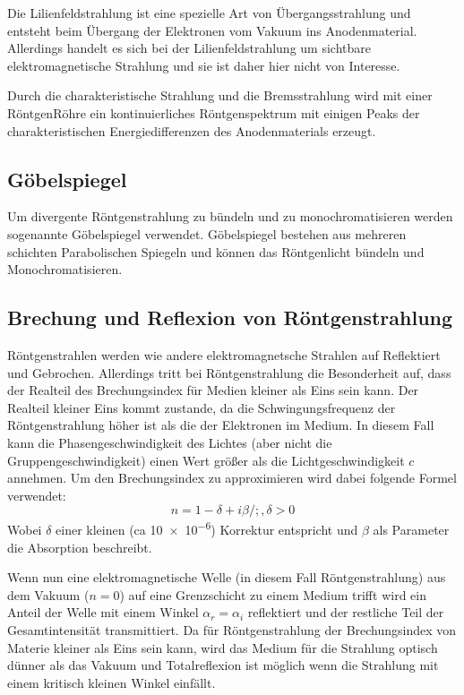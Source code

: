         Die Lilienfeldstrahlung ist eine spezielle Art von Übergangsstrahlung und entsteht beim Übergang der Elektronen vom Vakuum ins Anodenmaterial. Allerdings handelt es sich bei der Lilienfeldstrahlung um sichtbare elektromagnetische Strahlung und sie ist daher hier nicht von Interesse.

        Durch die charakteristische Strahlung und die Bremsstrahlung wird mit einer RöntgenRöhre ein kontinuierliches Röntgenspektrum mit einigen Peaks der charakteristischen Energiedifferenzen des Anodenmaterials erzeugt.
    \subsection{Göbelspiegel}
        Um divergente Röntgenstrahlung zu bündeln und zu monochromatisieren werden sogenannte Göbelspiegel verwendet.
        Göbelspiegel bestehen aus mehreren schichten Parabolischen Spiegeln und können das Röntgenlicht bündeln und Monochromatisieren.
    \subsection{Brechung und Reflexion von Röntgenstrahlung}
        Röntgenstrahlen werden wie andere elektromagnetsche Strahlen auf Reflektiert und Gebrochen.
        Allerdings tritt bei Röntgenstrahlung die Besonderheit auf, dass der Realteil des Brechungsindex für Medien kleiner als Eins sein kann.
        Der Realteil kleiner Eins kommt zustande, da die Schwingungsfrequenz der Röntgenstrahlung höher ist als die der Elektronen im Medium.
        In diesem Fall kann die Phasengeschwindigkeit des Lichtes (aber nicht die Gruppengeschwindigkeit) einen Wert größer als die Lichtgeschwindigkeit $c$ annehmen.
        Um den Brechungsindex zu approximieren wird dabei folgende Formel verwendet:
        \begin{equation}
            n = 1-\delta+i\beta /; , \delta > 0
        \end{equation}
        Wobei $\delta$ einer kleinen (ca \num{10e-6}) Korrektur entspricht und $\beta$ als Parameter die Absorption beschreibt.
        
        Wenn nun eine elektromagnetische Welle (in diesem Fall Röntgenstrahlung) aus dem Vakuum ($n = 0$) auf eine Grenzschicht zu einem Medium trifft wird ein Anteil der Welle mit einem Winkel $\alpha_r = \alpha_i$ reflektiert und der restliche Teil der Gesamtintensität transmittiert.
        Da für Röntgenstrahlung der Brechungsindex von Materie kleiner als Eins sein kann, wird das Medium für die Strahlung optisch dünner als das Vakuum und Totalreflexion ist möglich wenn die Strahlung mit einem kritisch kleinen Winkel einfällt.

